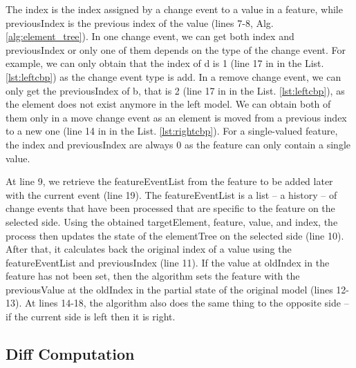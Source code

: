 \documentclass{jot}
\begin{document}
The \textsf{index} is the index assigned by a change event to a value in a feature, while \textsf{previousIndex} is the previous index of the value (lines 7-8, Alg. \ref{alg:element_tree}). In one change event, we can get both \textsf{index} and \textsf{previousIndex} or only one of them depends on the type of the change event. For example, we can only obtain that the \textsf{index} of \textsf{d} is 1 (line 17 in in the List. \ref{lst:leftcbp}) as the change event type is \textsf{add}. In a \textsf{remove} change event, we can only get the \textsf{previousIndex} of \textsf{b}, that is 2 (line 17 in in the List. \ref{lst:leftcbp}), as the element does not exist anymore in the left model. We can obtain both of them only in a \textsf{move} change event as an element is moved from a previous index to a new one (line 14 in in the List. \ref{lst:rightcbp}). For a single-valued feature, the \textsf{index} and \textsf{previousIndex} are always 0 as the feature can only contain a single value. 

At line 9, we retrieve the \textsf{featureEventList} from the \textsf{feature} to be added later with the current \textsf{event} (line 19). The \textsf{featureEventList} is a list -- a history -- of change events that have been processed that are specific to the \textsf{feature} on the selected \textsf{side}. Using the obtained \textsf{targetElement}, \textsf{feature}, \textsf{value}, and \textsf{index}, the process then updates the state of the \textsf{elementTree} on the selected \textsf{side} (line 10). After that, it calculates back the original index of a value using the \textsf{featureEventList} and \textsf{previousIndex} (line 11). If the value at \textsf{oldIndex} in the \textsf{feature} has not been set, then the algorithm sets the \textsf{feature} with the \textsf{previousValue} at the \textsf{oldIndex} in the partial state of the original model (lines 12-13). At lines 14-18, the algorithm also does the same thing to the opposite side -- if the current \textsf{side} is \textsf{left} then it is \textsf{right}.  

\subsection{Diff Computation}
\label{sec:diff_computation}
\end{document}
